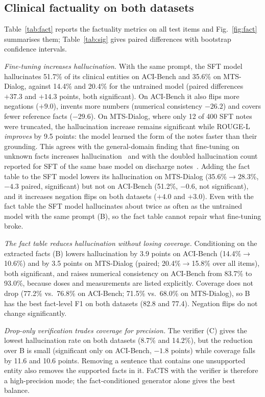 

\subsection{Clinical factuality on both datasets}
Table~\ref{tab:fact} reports the factuality metrics on all test items and Fig.~\ref{fig:fact} summarises
them; Table~\ref{tab:sig} gives paired differences with bootstrap confidence intervals.

\emph{Fine-tuning increases hallucination.} With the same prompt, the SFT model hallucinates 51.7\% of its
clinical entities on ACI-Bench and 35.6\% on MTS-Dialog, against 14.4\% and 20.4\% for the untrained model
(paired differences $+37.3$ and $+14.3$ points, both significant). On ACI-Bench it also flips more
negations ($+9.0$), invents more numbers (numerical consistency $-26.2$) and covers fewer reference facts
($-29.6$). On MTS-Dialog, where only 12 of 400 SFT notes were truncated, the hallucination increase remains
significant while ROUGE-L \emph{improves} by 9.5 points: the model learned the form of the notes faster
than their grounding. This agrees with the general-domain finding that fine-tuning on unknown facts
increases hallucination~\cite{gekhman2024} and with the doubled hallucination count reported for SFT of the
same base model on discharge notes~\cite{seethakantha2026hdsr}.
Adding the fact table to the SFT model lowers its hallucination on MTS-Dialog (35.6\%$\rightarrow$28.3\%,
$-4.3$ paired, significant) but not on ACI-Bench (51.2\%, $-0.6$, not significant), and it increases negation
flips on both datasets ($+4.0$ and $+3.0$). Even with the fact table the SFT model hallucinates about twice as
often as the untrained model with the same prompt (B), so the fact table cannot repair what fine-tuning broke.

\emph{The fact table reduces hallucination without losing coverage.} Conditioning on the extracted facts
(B) lowers hallucination by 3.9 points on ACI-Bench (14.4\%$\rightarrow$10.6\%) and by 3.5 points on
MTS-Dialog (paired; 20.4\%$\rightarrow$15.8\% over all items), both significant, and raises numerical
consistency on ACI-Bench from 83.7\% to 93.0\%, because doses and measurements are listed explicitly.
Coverage does not drop (77.2\% vs.\ 76.8\% on ACI-Bench; 71.5\% vs.\ 68.0\% on MTS-Dialog), so B has the best
fact-level F1 on both datasets (82.8 and 77.4). Negation flips do not change significantly.

\emph{Drop-only verification trades coverage for precision.} The verifier (C) gives the lowest
hallucination rate on both datasets (8.7\% and 14.2\%), but the reduction over B is small (significant only on
ACI-Bench, $-1.8$ points) while coverage falls by 11.6 and 10.6 points. Removing a sentence that contains one
unsupported entity also removes the supported facts in it. FaCTS with the verifier is therefore a
high-precision mode; the fact-conditioned generator alone gives the best balance.

